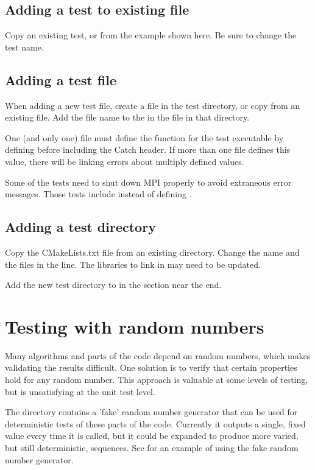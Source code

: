 \subsection{Adding a test to existing file}
Copy an existing test, or from the example shown here.  Be sure to change the test name.

\subsection{Adding a test file}
When adding a new test file,
create a file in the test directory, or copy from an existing file.  Add the file name to the  in the  file in that directory.

One (and only one) file must define the  function for the test executable by defining  before including the Catch header.  If more than one file defines this value, there will be linking errors about multiply defined values.

Some of the tests need to shut down MPI properly to avoid extraneous error messages. Those tests include  instead of defining .


\subsection{Adding a test directory}
Copy the CMakeLists.txt file from an existing  directory.
Change the  name and the  files in the  line.  The libraries to link in  may need to be updated.

Add the new test directory to  in the  section near the end.


\section{Testing with random numbers}
Many algorithms and parts of the code depend on random numbers, which makes validating the results difficult.
One solution is to verify that certain properties hold for any random number.
This approach is valuable at some levels of testing, but is unsatisfying at the unit test level.

The  directory contains a 'fake' random number generator that can be used for deterministic tests of these parts of the code.
Currently it outputs a single, fixed value every time it is called, but it could be expanded to produce more varied, but still deterministic, sequences.
See  for an example of using the fake random number generator.
